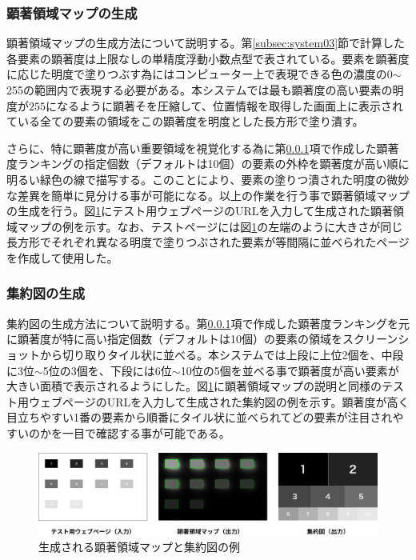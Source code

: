\subsubsection{顕著領域マップの生成}\label{subsec:system04-1}
\par 顕著領域マップの生成方法について説明する。第\ref{subsec:system03}節で計算した各要素の顕著度は上限なしの単精度浮動小数点型で表されている。要素を顕著度に応じた明度で塗りつぶす為にはコンピューター上で表現できる色の濃度の0$\sim$255の範囲内で表現する必要がある。本システムでは最も顕著度の高い要素の明度が$255$になるように顕著そを圧縮して、位置情報を取得した画面上に表示されている全ての要素の領域をこの顕著度を明度とした長方形で塗り潰す。

\par さらに、特に顕著度が高い重要領域を視覚化する為に第\ref{subsec:system04-1}項で作成した顕著度ランキングの指定個数（デフォルトは10個）の要素の外枠を顕著度が高い順に明るい緑色の線で描写する。このことにより、要素の塗りつ潰された明度の微妙な差異を簡単に見分ける事が可能になる。以上の作業を行う事で顕著領域マップの生成を行う。図\ref{fig_output-example}にテスト用ウェブページのURLを入力して生成された顕著領域マップの例を示す。なお、テストページには図\ref{fig_output-example}の左端のように大きさが同じ長方形でそれぞれ異なる明度で塗りつぶされた要素が等間隔に並べられたページを作成して使用した。

\subsubsection{集約図の生成}\label{subsec:system04-2}
\par 集約図の生成方法について説明する。第\ref{subsec:system04-1}項で作成した顕著度ランキングを元に顕著度が特に高い指定個数（デフォルトは10個）の要素の領域をスクリーンショットから切り取りタイル状に並べる。本システムでは上段に上位2個を、中段に3位$\sim$5位の3個を、下段には6位$\sim$10位の5個を並べる事で顕著度が高い要素が大きい面積で表示されるようにした。図\ref{fig_output-example}に顕著領域マップの説明と同様のテスト用ウェブページのURLを入力して生成された集約図の例を示す。顕著度が高く目立ちやすい1番の要素から順番にタイル状に並べられてどの要素が注目されやすいのかを一目で確認する事が可能である。

\begin{figure}[H]
  \centering
  \includegraphics[width=12.5cm]{figures/06_example-output.png}
  \caption{生成される顕著領域マップと集約図の例}
  \label{fig_output-example}
\end{figure}
